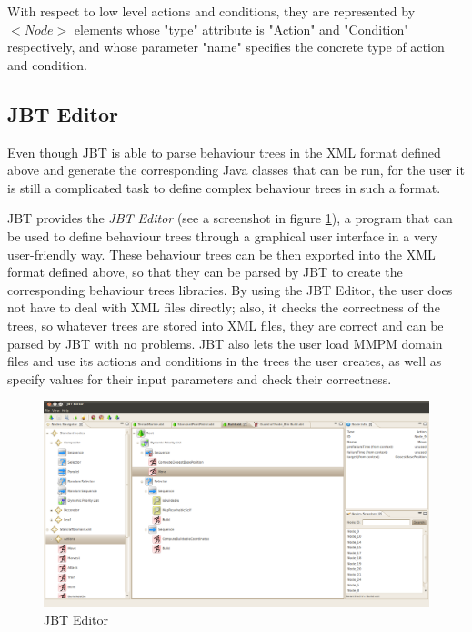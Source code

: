 \documentclass[a4paper,10pt]{article}
\begin{document}
With respect to low level actions and conditions, they are represented by $<Node>$ elements whose "type" attribute is "Action" and "Condition" respectively, and whose parameter "name" specifies the concrete type of action and condition.

\subsection{JBT Editor}

Even though JBT is able to parse behaviour trees in the XML format defined above and generate the corresponding Java classes that can be run, for the user it is still a complicated task to define complex behaviour trees in such a format.

JBT provides the \textit{JBT Editor} (see a screenshot in figure \ref{fig:JBTEditor}), a program that can be used to define behaviour trees through a graphical user interface in a very user-friendly way. These behaviour trees can be then exported into the XML format defined above, so that they can be parsed by JBT to create the corresponding behaviour trees libraries. By using the JBT Editor, the user does not have to deal with XML files directly; also, it checks the correctness of the trees, so whatever trees are stored into XML files, they are correct and can be parsed by JBT with no problems. JBT also lets the user load MMPM domain files and use its actions and conditions in the trees the user creates, as well as specify values for their input parameters and check their correctness.

\begin{figure}
 \centering
 \includegraphics[width=\textwidth]{./Images/JBTEditor.png}
 \caption{JBT Editor}
 \label{fig:JBTEditor}
\end{figure}



\end{document}
